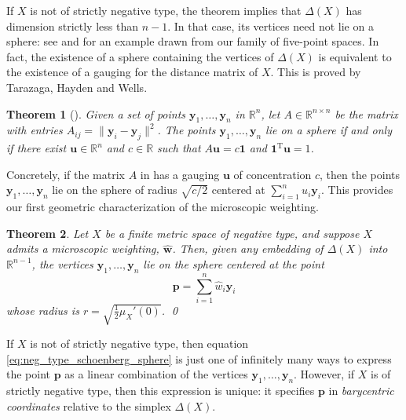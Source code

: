 \documentclass[a4paper, oneside, reqno]{amsart}
\newtheorem{theorem}{Theorem}[section]
\theoremstyle{definition}
\theoremstyle{remark}
\numberwithin{equation}{section}
\renewcommand{\vec}{\mathbf}
\newcommand{\onevector}{\mathbf{1}}
\newcommand{\transpose}{\mathrm{T}}
\newcommand{\R}{\mathbb{R}}
\newcommand{\micro}{\widehat{\vec{w}}}
\begin{document}
If \(X\) is not of strictly negative type, the theorem implies that \(\Delta(X)\) has dimension strictly less than \(n-1\). In that case, its vertices need not lie on a sphere: see  and  for an example drawn from our family of five-point spaces. In fact, the existence of a sphere containing the vertices of \(\Delta(X)\) is {equivalent} to the existence of a gauging for the distance matrix of \(X\). This is proved by Tarazaga, Hayden and Wells.

\begin{theorem}[{\cite[Theorem~3.4]{TarazagaHaydenWells}}]
\label{thm:circum-euclidean_distance_matrix}
    Given a set of points \(\vec{y}_1, \ldots, \vec{y}_n\) in \(\R^n\), let \(A \in 
    \R^{n \times n}\) be the matrix with entries \(A_{ij} = \|\vec{y}_i - \vec{y}_j\|^2\). The points \(\vec{y}_1,\ldots,\vec{y}_n\) lie on a sphere if and only if there exist \(\vec{u} \in \R^n\) and \(c \in \R\) such that \(A\vec{u} = c \onevector\) and \(\onevector^\transpose \vec{u} = 1\).
\end{theorem}

Concretely, if the matrix \(A\) in  has a gauging \(\vec{u}\) of concentration \(c\), then the points \(\vec{y}_1, \ldots, \vec{y}_n\) lie on the sphere of radius \(\sqrt{c/2}\) centered at \(\sum_{i=1}^n u_i \vec{y}_i\). This provides our first geometric characterization of the microscopic weighting.

\begin{theorem}
\label{thm:neg_type_schoenberg_sphere}
Let \(X\) be a finite metric space of negative type, and suppose \(X\) admits a microscopic weighting, \(\micro\). Then, given any embedding of \(\Delta(X)\) into \(\mathbb{R}^{n-1}\), the vertices \(\vec{y}_1, \ldots, \vec{y}_n\) lie on the sphere centered at the point
\begin{equation}\label{eq:neg_type_schoenberg_sphere}
\vec{p} = \sum_{i=1}^n \widehat{w}_i \vec{y}_i
\end{equation}
whose radius is \(r = \sqrt{\frac{1}{2} \mu_X'(0)}\). 
\qed
\end{theorem}

If \(X\) is not of strictly negative type, then equation \eqref{eq:neg_type_schoenberg_sphere} is just one of infinitely many ways to express the point \(\vec{p}\) as a linear combination of the vertices \(\vec{y}_1,\ldots, \vec{y}_n\). However, if \(X\) is of strictly negative type, then this expression is unique: it specifies \(\vec{p}\) in \emph{barycentric coordinates} relative to the simplex \(\Delta(X)\).
\end{document}
